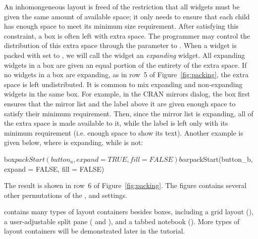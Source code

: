 \documentclass[article,shortnames]{jss}
\begin{document}
An inhomongeneous layout is freed of the restriction that all widgets
must be given the same amount of available space; it only needs to
ensure that each child has enough space to meet its minimum size
requirement. After satisfying this constraint, a box is often left
with extra space. The programmer may control the distribution of this
extra space through the  parameter to
.  When a widget is packed with 
set to , we will call the widget an \emph{expanding}
widget. All expanding widgets in a box are given an equal portion of
the entirety of the extra space. If no widgets in a box are expanding,
as in row~5 of Figure~\ref{fig:packing}, the extra space is left
undistributed. It is common to mix expanding and non-expanding widgets
in the same box. For example, in the CRAN mirrors dialog, the box
first ensures that the mirror list and the label above it are given
enough space to satisfy their minimum requirement. Then, since the
mirror list is expanding, all of the extra space is made available to
it, while the label is left only with its minimum requirement (i.e.
enough space to show its text).
Another example is given below, where  is expanding,
while  is not:
\begin{Code}
box$packStart(button_a, expand = TRUE, fill = FALSE)
box$packStart(button_b, expand = FALSE, fill = FALSE)
\end{Code}
The result is shown in row~6 of Figure~\ref{fig:packing}. 
The figure contains several other permutations of the
,  and  settings.

 contains many types of layout containers besides boxes,
including 
a grid layout (), a user-adjustable split pane
(
and ), and a tabbed notebook ().
More types of
layout containers will be demonstrated later in the tutorial.


\end{document}
